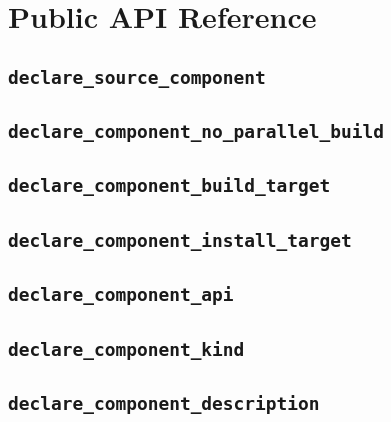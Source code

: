 %
%
%
%
\chapter{Public API Reference}
\section{\texttt{declare\_source\_component}}

\section{\texttt{declare\_component\_no\_parallel\_build}}\label{api:declare-component-no-parallel-build}
\section{\texttt{declare\_component\_build\_target}}\label{api:declare-component-build-target}
\section{\texttt{declare\_component\_install\_target}}\label{api:declare-component-install-target}
\section{\texttt{declare\_component\_api}}\label{api:declare-component-api}
\section{\texttt{declare\_component\_kind}}\label{api:declare-component-kind}
\section{\texttt{declare\_component\_description}}\label{api:declare-component-description}
